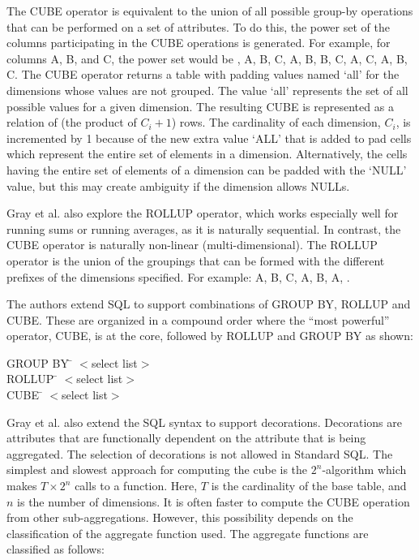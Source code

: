 \documentclass[]{article}
\begin{document}
 The CUBE operator is equivalent to the union of all possible group-by operations that can be performed on a set of
attributes. To do this, the power set of the columns participating in the CUBE operations is generated. For example, for
columns A, B, and C, the power set would be {{}, {A}, {B}, {C}, {A, B}, {B, C}, {A, C}, {A, B, C}}. The CUBE operator returns
a table with padding values named ‘all’ for the dimensions whose values are not grouped. The value ‘all’ represents the set of
all possible values for a given dimension. The resulting CUBE is represented as a relation of (the product of $C_i+1$) rows.
The cardinality of each dimension, $C_i$, is incremented by 1 because of the new extra value ‘ALL’ that is added to pad cells which
represent the entire set of elements in a dimension. Alternatively, the cells having the entire set of elements of a dimension
can be padded with the ‘NULL’ value, but this may create ambiguity if the dimension allows NULLs.
 
Gray et al. also explore the ROLLUP operator, which works especially well for running sums or running averages, as it is
naturally sequential. In contrast, the CUBE operator is naturally non-linear (multi-dimensional). The ROLLUP operator is the
union of the groupings that can be formed with the different prefixes of the dimensions specified. For example: {{A, B, C},
{A, B}, {A}, {}}.

The authors extend SQL to support combinations of GROUP BY, ROLLUP and CUBE. These are organized in a compound order where the
“most powerful” operator, CUBE, is at the core, followed by ROLLUP and GROUP BY as shown:

\begin{tabbing}
GROUP BY \= $<$select list$>$\\
\> ROLLUP \= $<$select list$>$\\
\> \> CUBE \= $<$select list$>$\\
\end{tabbing}

Gray et al. also extend the SQL syntax to support decorations. Decorations are attributes that are functionally dependent on
the attribute that is being aggregated. The selection of decorations is not allowed in Standard SQL. The simplest and slowest
approach for computing the cube is the $2^n$-algorithm which makes $T\times2^n$ calls to a function. Here, $T$ is the cardinality of
the base table, and $n$ is the number of dimensions. It is often faster to compute the CUBE operation from other
sub-aggregations. However, this possibility depends on the classification of the aggregate function used. The aggregate
functions are classified as follows:
\end{document}
